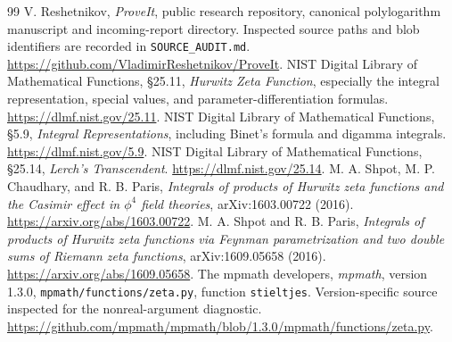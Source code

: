 \documentclass[11pt,a4paper]{article}
\theoremstyle{definition}
\numberwithin{equation}{section}
\begin{document}
\begin{thebibliography}{99}
V. Reshetnikov, \emph{ProveIt}, public research repository, canonical
polylogarithm manuscript and incoming-report directory. Inspected source
paths and blob identifiers are recorded in \texttt{SOURCE\_AUDIT.md}.
\url{https://github.com/VladimirReshetnikov/ProveIt}.
NIST Digital Library of Mathematical Functions, \S25.11, \emph{Hurwitz Zeta
Function}, especially the integral representation, special values,
and parameter-differentiation formulas.
\url{https://dlmf.nist.gov/25.11}.
NIST Digital Library of Mathematical Functions, \S5.9, \emph{Integral
Representations}, including Binet's formula and digamma integrals.
\url{https://dlmf.nist.gov/5.9}.
NIST Digital Library of Mathematical Functions, \S25.14, \emph{Lerch's
Transcendent}.
\url{https://dlmf.nist.gov/25.14}.
M. A. Shpot, M. P. Chaudhary, and R. B. Paris,
\emph{Integrals of products of Hurwitz zeta functions and the Casimir effect
in $\phi^4$ field theories}, arXiv:1603.00722 (2016).
\url{https://arxiv.org/abs/1603.00722}.
M. A. Shpot and R. B. Paris,
\emph{Integrals of products of Hurwitz zeta functions via Feynman
parametrization and two double sums of Riemann zeta functions},
arXiv:1609.05658 (2016).
\url{https://arxiv.org/abs/1609.05658}.
The mpmath developers, \emph{mpmath}, version 1.3.0,
\texttt{mpmath/functions/zeta.py}, function \texttt{stieltjes}.
Version-specific source inspected for the nonreal-argument diagnostic.
\url{https://github.com/mpmath/mpmath/blob/1.3.0/mpmath/functions/zeta.py}.
\end{thebibliography}
\end{document}
